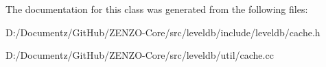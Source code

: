 The documentation for this class was generated from the following files\+:\begin{DoxyCompactItemize}
\item 
D\+:/\+Documentz/\+Git\+Hub/\+Z\+E\+N\+Z\+O-\/\+Core/src/leveldb/include/leveldb/cache.\+h\item 
D\+:/\+Documentz/\+Git\+Hub/\+Z\+E\+N\+Z\+O-\/\+Core/src/leveldb/util/cache.\+cc\end{DoxyCompactItemize}
